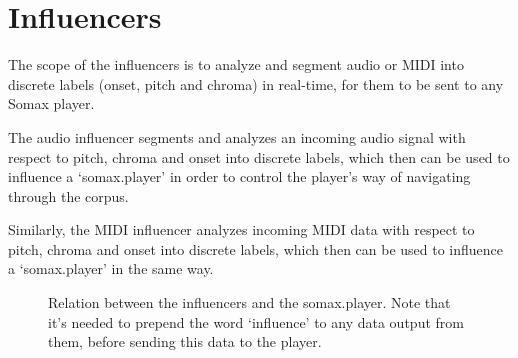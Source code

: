 \clearpage

\section{Influencers}

The scope of the influencers is to analyze and segment audio or MIDI into discrete labels (onset, pitch and chroma) in real-time, for them to be sent to any Somax player.

The audio influencer segments and analyzes an incoming audio signal with respect to pitch, chroma and onset into discrete labels, which then can be used to influence a `somax.player' in order to control the player's way of navigating through the corpus.

Similarly, the MIDI influencer analyzes incoming MIDI data with respect to pitch, chroma and onset into discrete labels, which then can be used to influence a `somax.player' in the same way. 

\begin{figure}[H]
  \centering
  \hfill
  \caption{Relation between the influencers and the somax.player. Note that it's needed to prepend the word `influence' to any data output from them, before sending this data to the player.}
\end{figure}

